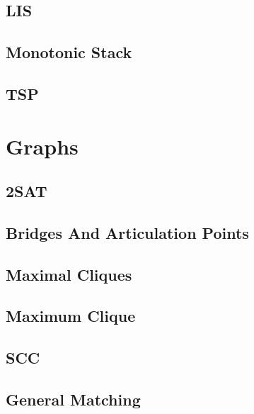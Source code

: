 \subsection{LIS}
\raggedbottom
\hrulefill
\subsection{Monotonic Stack}
\raggedbottom
\hrulefill
\subsection{TSP}
\raggedbottom
\hrulefill
\newpage

\section{Graphs}
\subsection{2SAT}
\raggedbottom
\hrulefill
\subsection{Bridges And Articulation Points}
\raggedbottom
\hrulefill
\subsection{Maximal Cliques}
\raggedbottom
\hrulefill
\subsection{Maximum Clique}
\raggedbottom
\hrulefill
\subsection{SCC}
\raggedbottom
\hrulefill
\subsection{General Matching}
\raggedbottom
\hrulefill
